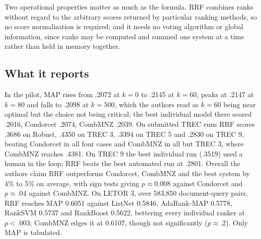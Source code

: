 Two operational properties matter as much as the formula. RRF combines ranks without regard to the arbitrary scores returned by particular ranking methods, so no score normalisation is required; and it needs no voting algorithm or global information, since ranks may be computed and summed one system at a time rather than held in memory together.

\subsection{What it reports}

In the pilot, MAP rises from .2072 at $k=0$ to .2145 at $k=60$, peaks at .2147 at $k=80$ and falls to .2098 at $k=500$, which the authors read as $k=60$ being near optimal but the choice not being critical; the best individual model there scored .2016, Condorcet .2074, CombMNZ .2039. On submitted TREC runs RRF scores .3686 on Robust, .4350 on TREC 3, .3394 on TREC 5 and .2830 on TREC 9, beating Condorcet in all four cases and CombMNZ in all but TREC 3, where CombMNZ reaches .4381. On TREC 9 the best individual run (.3519) used a human in the loop; RRF beats the best automated run at .2801. Overall the authors claim RRF outperforms Condorcet, CombMNZ and the best system by 4\% to 5\% on average, with sign tests giving $p \approx 0.008$ against Condorcet and $p \approx .04$ against CombMNZ. On LETOR 3, over 583,850 document-query pairs, RRF reaches MAP 0.6051 against ListNet 0.5846, AdaRank-MAP 0.5778, RankSVM 0.5737 and RankBoost 0.5622, bettering every individual ranker at $p < .003$; CombMNZ edges it at 0.6107, though not significantly ($p \approx .2$). Only MAP is tabulated.

